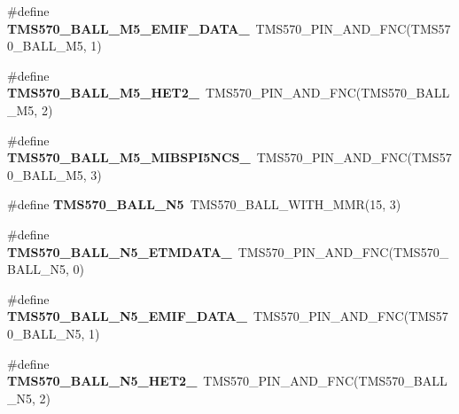\begin{DoxyCompactItemize}
\item 
\mbox{\label{tms570lc4357-pins_8h_a2f101f7717949d24560db1fdcd0ad8e3}} 
\#define {\bfseries T\+M\+S570\+\_\+\+B\+A\+L\+L\+\_\+\+M5\+\_\+\+E\+M\+I\+F\+\_\+\+D\+A\+T\+A\+\_}~T\+M\+S570\+\_\+\+P\+I\+N\+\_\+\+A\+N\+D\+\_\+\+F\+NC(T\+M\+S570\+\_\+\+B\+A\+L\+L\+\_\+\+M5, 1)
\item 
\mbox{\label{tms570lc4357-pins_8h_ae68bdd0724d3fa7c4e89345619b56895}} 
\#define {\bfseries T\+M\+S570\+\_\+\+B\+A\+L\+L\+\_\+\+M5\+\_\+\+H\+E\+T2\+\_}~T\+M\+S570\+\_\+\+P\+I\+N\+\_\+\+A\+N\+D\+\_\+\+F\+NC(T\+M\+S570\+\_\+\+B\+A\+L\+L\+\_\+\+M5, 2)
\item 
\mbox{\label{tms570lc4357-pins_8h_a9a8da06625ffbf65aafbddb0ab56a20e}} 
\#define {\bfseries T\+M\+S570\+\_\+\+B\+A\+L\+L\+\_\+\+M5\+\_\+\+M\+I\+B\+S\+P\+I5\+N\+C\+S\+\_}~T\+M\+S570\+\_\+\+P\+I\+N\+\_\+\+A\+N\+D\+\_\+\+F\+NC(T\+M\+S570\+\_\+\+B\+A\+L\+L\+\_\+\+M5, 3)
\item 
\mbox{\label{tms570lc4357-pins_8h_aef47d7bf812397626967cacc81ea819a}} 
\#define {\bfseries T\+M\+S570\+\_\+\+B\+A\+L\+L\+\_\+\+N5}~T\+M\+S570\+\_\+\+B\+A\+L\+L\+\_\+\+W\+I\+T\+H\+\_\+\+M\+MR(15, 3)
\item 
\mbox{\label{tms570lc4357-pins_8h_ac4bba4c53cd91fe10cf19ce8ab65b92d}} 
\#define {\bfseries T\+M\+S570\+\_\+\+B\+A\+L\+L\+\_\+\+N5\+\_\+\+E\+T\+M\+D\+A\+T\+A\+\_}~T\+M\+S570\+\_\+\+P\+I\+N\+\_\+\+A\+N\+D\+\_\+\+F\+NC(T\+M\+S570\+\_\+\+B\+A\+L\+L\+\_\+\+N5, 0)
\item 
\mbox{\label{tms570lc4357-pins_8h_ac35eadee100f136168be1b7c68ff1c29}} 
\#define {\bfseries T\+M\+S570\+\_\+\+B\+A\+L\+L\+\_\+\+N5\+\_\+\+E\+M\+I\+F\+\_\+\+D\+A\+T\+A\+\_}~T\+M\+S570\+\_\+\+P\+I\+N\+\_\+\+A\+N\+D\+\_\+\+F\+NC(T\+M\+S570\+\_\+\+B\+A\+L\+L\+\_\+\+N5, 1)
\item 
\mbox{\label{tms570lc4357-pins_8h_ad32abc8919f030635d29490680fcd347}} 
\#define {\bfseries T\+M\+S570\+\_\+\+B\+A\+L\+L\+\_\+\+N5\+\_\+\+H\+E\+T2\+\_}~T\+M\+S570\+\_\+\+P\+I\+N\+\_\+\+A\+N\+D\+\_\+\+F\+NC(T\+M\+S570\+\_\+\+B\+A\+L\+L\+\_\+\+N5, 2)
\item 

\end{DoxyCompactItemize}
